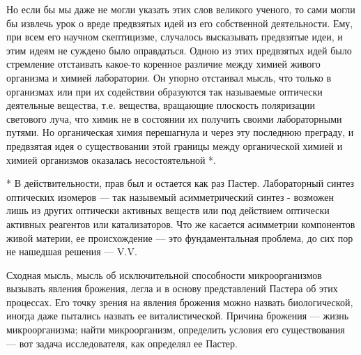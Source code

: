 Но если бы мы даже не могли указать этих слов великого ученого, то  сами
могли бы  извлечь  урок  о  вреде предвзятых  идей  из  его  собственной
деятельности.  Ему,  при   всем  его   научном  скептицизме,   случалось
высказывать предвзятые идеи, и этим  идеям не суждено было  оправдаться.
Одною из  этих  предвзятых  идей  было  стремление  отстаивать  какое-то
коренное различие между химией живого организма и химией лаборатории. Он
упорно отстаивал мысль, что  только в организмах  или при их  содействии
образуются так называемые оптически деятельные вещества, т.е.  вещества,
вращающие плоскость поляризации светового луча, что химик не в состоянии
их  получить  своими   лабораторными  путями.   Но  органическая   химия
перешагнула  и  через  эту  последнюю  преграду,  и  предвзятая  идея  о
существовании этой границы между органической химией и химией организмов
оказалась несостоятельной *.

* В действительности, прав был и остается как раз Пастер. Лабораторный
синтез оптических изомеров --- так назывемый асимметрический синтез -
возможен лишь из других оптически активных веществ или под действием
оптически активных реагентов или катализаторов. Что же касается
асимметрии компонентов живой материи, ее происхождение --- это
фундаментальная проблема, до сих пор не нашедшая решения --- V.V.

Сходная  мысль,  мысль  об  исключительной  способности  микроорганизмов
вызывать явления брожения,  легла и  в основу  представлений Пастера  об
этих процессах.  Его  точку зрения  на  явления брожения  можно  назвать
биологической, иногда даже пытались назвать ее виталистической.  Причина
брожения --- жизнь микроорганизма; найти микроорганизм, определить условия
его существования --- вот задача исследователя, как определял ее Пастер.

